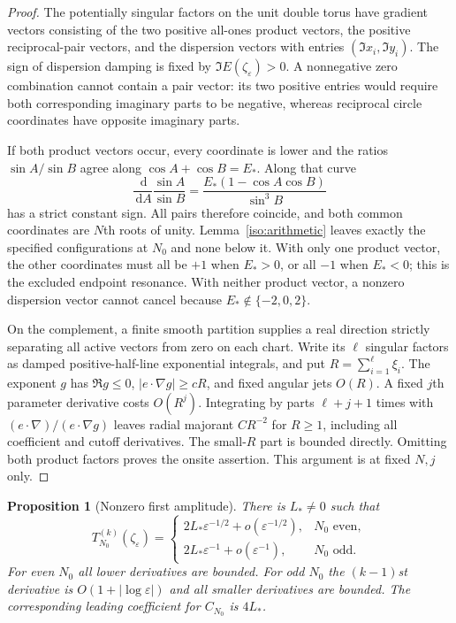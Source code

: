 \documentclass[11pt]{article}
\numberwithin{equation}{section}
\newtheorem{proposition}[theorem]{Proposition}
\theoremstyle{definition}
\newcommand{\dd}{\,\mathrm d}
\newcommand{\eps}{\varepsilon}
\begin{document}
\begin{proof}
The potentially singular factors on the unit double torus have gradient
vectors consisting of the two positive all-ones product vectors, the
positive reciprocal-pair vectors, and the dispersion vectors with entries
$(\Im x_i,\Im y_i)$. The sign of dispersion damping is fixed by
$\Im E(\zeta_\eps)>0$. A nonnegative zero combination cannot contain
a pair vector: its two positive entries would require both corresponding
imaginary parts to be negative, whereas reciprocal circle coordinates
have opposite imaginary parts.

If both product vectors occur, every coordinate is lower and the ratios
$\sin A/\sin B$ agree along $\cos A+\cos B=E_*$. Along that curve
\[
 \frac{\dd}{\dd A}\frac{\sin A}{\sin B}
 =\frac{E_*(1-\cos A\cos B)}{\sin^3B}
\]
has a strict constant sign. All pairs therefore coincide, and both common
coordinates are $N$th roots of unity. Lemma~\ref{iso:arithmetic} leaves
exactly the specified configurations at $N_0$ and none below it.
With only one product vector, the other coordinates must all be $+1$
when $E_*>0$, or all $-1$ when $E_*<0$; this is the excluded endpoint
resonance. With neither product vector, a nonzero dispersion vector cannot
cancel because $E_*\notin\{-2,0,2\}$.

On the complement, a finite smooth partition supplies a real direction
strictly separating all active vectors from zero on each chart. Write
its $\ell$ singular factors as damped positive-half-line exponential
integrals, and put $R=\sum_{i=1}^\ell\xi_i$. The exponent $g$ has
$\Re g\le0$, $|e\cdot\nabla g|\ge cR$, and fixed angular jets
$O(R)$. A fixed $j$th parameter derivative costs $O(R^j)$.
Integrating by parts $\ell+j+1$ times with
$(e\cdot\nabla)/(e\cdot\nabla g)$ leaves radial majorant $CR^{-2}$
for $R\ge1$, including all coefficient and cutoff derivatives. The
small-$R$ part is bounded directly. Omitting both product factors proves
the onsite assertion. This argument is at fixed $N,j$ only.
\end{proof}

\begin{proposition}[Nonzero first amplitude]\label{iso:first}
There is $L_*\ne0$ such that
\[
 T_{N_0}^{(k)}(\zeta_\eps)=
 \begin{cases}
 2L_*\eps^{-1/2}+o(\eps^{-1/2}),&N_0\text{ even},\\
 2L_*\eps^{-1}+o(\eps^{-1}),&N_0\text{ odd}.
 \end{cases}
\]
For even $N_0$ all lower derivatives are bounded. For odd $N_0$ the
$(k-1)$st derivative is $O(1+|\log\eps|)$ and all smaller derivatives
are bounded. The corresponding leading coefficient for $C_{N_0}$ is
$4L_*$.
\end{proposition}
\end{document}
